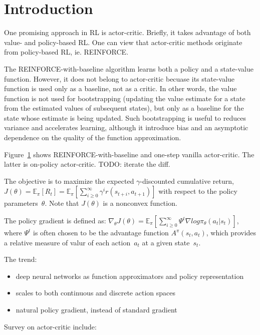 \section{Introduction}

One promising approach in RL is actor-critic.
Briefly, it takes advantage of both value- and policy-based RL.
One can view that actor-critic methods originate from policy-based RL, ie. REINFORCE.

The REINFORCE-with-baseline algorithm learns both a policy and a state-value function.
However, it does not belong to actor-critic becuase
its state-value function is used only as a baseline, not as a critic.
In other words, the value function is not used for bootstrapping
(updating the value estimate for a state from the estimated values of subsequent states),
but only as a baseline for the state whose estimate is being updated.
Such bootstrapping is useful to reduces variance and accelerates learning,
although it introduce bias and an asymptotic dependence on
the quality of the function approximation.

Figure~\ref{} shows REINFORCE-with-baseline and one-step vanilla actor-critic.
The latter is on-policy actor-critic.
TODO: iterate the diff.

The objective is to
maximize the expected $\gamma$-discounted cumulative return,
$J(\theta) = \mathbb{E}_{\pi} [R_t] = \mathbb{E}_{\pi} [ \sum_{i \ge 0}^{\infty} \gamma^i r(s_{t+i}, a_{t+1}) ]$
with respect to the policy parameters~$\theta$.
Note that $J(\theta)$ is a nonconvex function.

The policy gradient is defined as:
$\nabla_{\theta} J(\theta) = \mathbb{E}_{\pi} [ \sum_{i \ge 0}^{\infty} \Psi^t \nabla log \pi_{\theta} (a_t | s_t) ]$,
where $\Psi^t$ is often chosen to be the advantage function $A^{\pi}(s_t,a_t)$,
which provides a relative measure of valur of each action~$a_t$ at a given state~$s_t$.

The trend:
\begin{itemize}
\item deep neural networks as
      function approximators and policy representation
\item scales to both continuous and discrete action spaces
\item natural policy gradient, instead of standard gradient
\end{itemize}

Survey on actor-critic include:
\cite{6392457}


